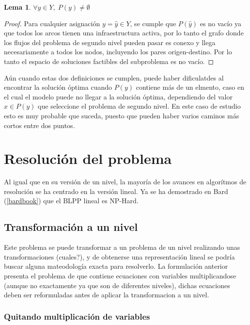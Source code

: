 \documentclass{article}
\newtheorem{lemma}{Lema}
\begin{document}
  \begin{lemma}$\forall y \in Y,\; P(y) \neq \emptyset$
  \end{lemma}

  \begin{proof}
    Para cualquier asignación $y = \hat{y} \in Y$, se cumple que $P(\hat{y})$ es no vacío ya que todos los arcos tienen una infraestructura activa, por lo tanto el grafo donde los flujos del problema de segundo nivel pueden pasar es conexo y llega necesariamente a todos los nodos, incluyendo los pares origen-destino. Por lo tanto el espacio de soluciones factibles del subproblema es no vacío. 
  \end{proof}

  Aún cuando estas dos definiciones se cumplen, puede haber dificulatdes al encontrar la solución óptima cuando $P(y)$ contiene más de un elmento, caso en el cual el modelo puede no llegar a la solución óptima, dependiendo del valor $x \in P(y)$ que seleccione el problema de segundo nivel. En este caso de estudio esto es muy probable que suceda, puesto que pueden haber varios caminos más cortos entre dos puntos.

  \section*{Resolución del problema}

  Al igual que en su versión de un nivel, la mayoría de los avances en algorítmos de resolución se ha centrado en la versión lineal. Ya se ha demostrado en Bard (\ref{bardbook}) que el BLPP lineal es NP-Hard.

  \subsection*{Transformación a un nivel}

  Este problema se puede transformar a un problema de un nivel realizando unas transformaciones (cuales?), y de obtenerse una representación lineal se podría buscar alguna mateodología exacta para resolverlo. La formulación anterior presenta el problema de que contiene ecuaciones con variables multiplicandose (aunque no exactamente ya que son de diferentes niveles), dichas ecuaciones deben ser reformuladas antes de aplicar la transformacion a un nivel.

  \subsubsection*{Quitando multiplicación de variables}
\end{document}
